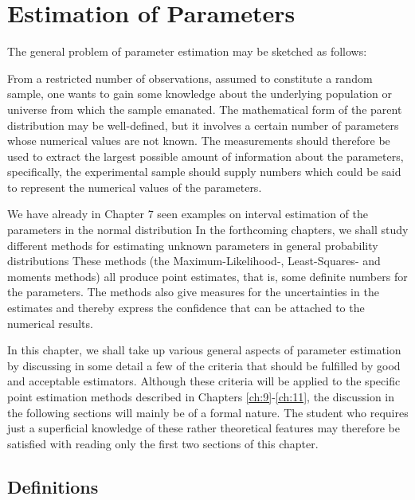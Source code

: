 \documentclass[../main.tex]{subfiles}
\begin{document}
\chapter{Estimation of Parameters}

The general problem of parameter estimation may be sketched as follows:

From a restricted number of observations,
assumed to constitute a random sample,
one wants to gain some knowledge about the underlying population or universe
from which the sample emanated.
The mathematical form of the parent distribution may be well-defined,
but it involves a certain number of parameters
whose numerical values are not known.
The measurements should therefore be used to extract the largest possible amount of information about the parameters,
specifically,
the experimental sample should supply numbers which could be said to represent the numerical values of the parameters.

We have already in Chapter 7 seen examples on interval estimation of the parameters in the normal distribution
In the forthcoming chapters,
we shall study different methods for estimating unknown parameters in general probability distributions
These methods
(the Maximum-Likelihood-, Least-Squares- and moments methods)
all produce point estimates,
that is, some definite numbers for the parameters.
The methods also give measures for the uncertainties in the estimates
and thereby express the confidence that can be attached to the numerical results.

In this chapter,
we shall take up various general aspects of parameter estimation
by discussing in some detail a few of the criteria that should be fulfilled by good and acceptable estimators.
Although these criteria will be applied to the specific point estimation methods described in Chapters \ref{ch:9}-\ref{ch:11},
the discussion in the following sections will mainly be of a formal nature.
The student who requires just a superficial knowledge of these rather theoretical features
may therefore be satisfied with reading only the first two sections of this chapter.

\section{Definitions}
\end{document}
